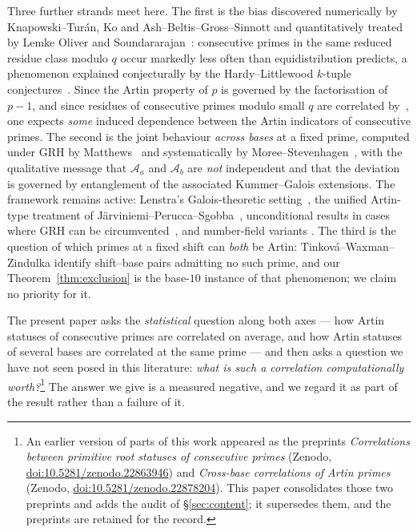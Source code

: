 \documentclass[11pt,reqno]{amsart}
\theoremstyle{plain}
\theoremstyle{definition}
\newcommand{\Acal}{\mathcal{A}}
\begin{document}
Three further strands meet here. The first is the bias discovered numerically by
Knapowski--Tur\'an, Ko and Ash--Beltis--Gross--Sinnott and quantitatively treated by
Lemke Oliver and Soundararajan~\cite{LOS2016}: consecutive primes in the same reduced
residue class modulo $q$ occur markedly less often than equidistribution predicts, a
phenomenon explained conjecturally by the Hardy--Littlewood $k$-tuple
conjectures~\cite{HardyLittlewood1923}. Since the Artin property of $p$ is governed by the
factorisation of $p-1$, and since residues of consecutive primes modulo small $q$ are
correlated by~\cite{LOS2016}, one expects \emph{some} induced dependence between the Artin
indicators of consecutive primes. The second is the joint behaviour \emph{across bases} at
a fixed prime, computed under GRH by Matthews~\cite{Matthews1976} and systematically by
Moree--Stevenhagen~\cite{MoreeStevenhagen2014}, with the qualitative message that
$\Acal_a$ and $\Acal_b$ are \emph{not} independent and that the deviation is governed by
entanglement of the associated Kummer--Galois extensions. The framework remains active:
Lenstra's Galois-theoretic setting~\cite{Lenstra1977}, the unified Artin-type treatment of
J\"arviniemi--Perucca--Sgobba~\cite{JarviniemiPeruccaSgobba2025}, unconditional results in
cases where GRH can be circumvented~\cite{Sgobba2025}, and number-field variants
\cite{Kimmel2024}. The third is the question of
which primes at a fixed shift can \emph{both} be Artin: Tinkov\'a--Waxman--Zindulka
\cite{TinkovaWaxmanZindulka2023} identify shift--base pairs admitting no such prime, and
our Theorem~\ref{thm:exclusion} is the base-$10$ instance of that phenomenon; we claim no
priority for it.

The present paper asks the \emph{statistical} question along both axes --- how Artin
statuses of consecutive primes are correlated on average, and how Artin statuses of several
bases are correlated at the same prime --- and then asks a question we have not seen posed
in this literature: \emph{what is such a correlation computationally worth?}\footnote{An
earlier version of parts of this work appeared as the preprints \emph{Correlations between
primitive root statuses of consecutive primes} (Zenodo,
\href{https://doi.org/10.5281/zenodo.22863946}{doi:10.5281/zenodo.22863946}) and
\emph{Cross-base correlations of Artin primes} (Zenodo,
\href{https://doi.org/10.5281/zenodo.22878204}{doi:10.5281/zenodo.22878204}). This paper
consolidates those two preprints and adds the audit of \S\ref{sec:content}; it supersedes
them, and the preprints are retained for the record.} The answer we give is a measured
negative, and we regard it as part of the result rather than a failure of it.
\end{document}
